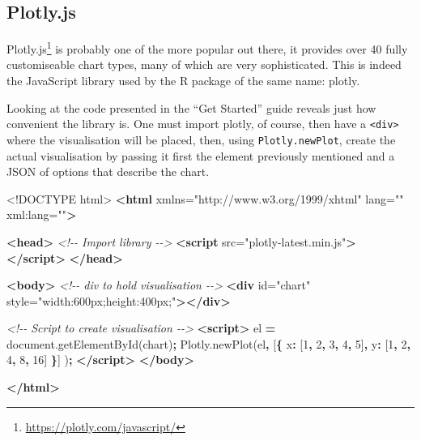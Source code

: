 \documentclass[
]{krantz}
\makeatletter
\newenvironment{Shaded}{\begin{snugshade}}{\end{snugshade}}
\newcommand{\AttributeTok}[1]{\textcolor[rgb]{0.61,0.61,0.61}{#1}}
\newcommand{\CommentTok}[1]{\textcolor[rgb]{0.37,0.37,0.37}{\textit{#1}}}
\newcommand{\DataTypeTok}[1]{\textcolor[rgb]{0.27,0.27,0.27}{#1}}
\newcommand{\DecValTok}[1]{\textcolor[rgb]{0.06,0.06,0.06}{#1}}
\newcommand{\KeywordTok}[1]{\textcolor[rgb]{0.27,0.27,0.27}{\textbf{#1}}}
\newcommand{\NormalTok}[1]{#1}
\newcommand{\OperatorTok}[1]{\textcolor[rgb]{0.43,0.43,0.43}{\textbf{#1}}}
\newcommand{\OtherTok}[1]{\textcolor[rgb]{0.37,0.37,0.37}{#1}}
\newcommand{\StringTok}[1]{\textcolor[rgb]{0.5,0.5,0.5}{#1}}
\newcommand{\VariableTok}[1]{\textcolor[rgb]{0,0,0}{#1}}
\renewcommand{\href}[2]{#2\footnote{\url{#1}}}
\newenvironment{kframe}{%
\medskip{}
\setlength{\fboxsep}{.8em}
 \def\at@end@of@kframe{}%
 \ifinner\ifhmode%
  \def\at@end@of@kframe{\end{minipage}}%
  \begin{minipage}{\columnwidth}%
 \fi\fi%
 \def\FrameCommand##1{\hskip\@totalleftmargin \hskip-\fboxsep
 \colorbox{shadecolor}{##1}\hskip-\fboxsep
     \hskip-\linewidth \hskip-\@totalleftmargin \hskip\columnwidth}%
 \MakeFramed {\advance\hsize-\width
   \@totalleftmargin\z@ \linewidth\hsize
   \@setminipage}}%
 {\par\unskip\endMakeFramed%
 \at@end@of@kframe}
\renewenvironment{Shaded}{\begin{kframe}}{\end{kframe}}
\makeatother
\begin{document}
\hypertarget{widgets-basics-candidates-plotly}{%
\subsection{Plotly.js}\label{widgets-basics-candidates-plotly}}

\href{https://plotly.com/javascript/}{Plotly.js} is probably one of the more popular out there, it provides over 40 fully customiseable chart types, many of which are very sophisticated. This is indeed the JavaScript library used by the R package of the same name: plotly.

Looking at the code presented in the ``Get Started'' guide reveals just how convenient the library is. One must import plotly, of course, then have a \texttt{\textless{}div\textgreater{}} where the visualisation will be placed, then, using \texttt{Plotly.newPlot}, create the actual visualisation by passing it first the element previously mentioned and a JSON of options that describe the chart.

\begin{Shaded}
\begin{Highlighting}[]
\DataTypeTok{<!DOCTYPE }\NormalTok{html}\DataTypeTok{>}
\KeywordTok{<html}\OtherTok{ xmlns=}\StringTok{"http://www.w3.org/1999/xhtml"}\OtherTok{ lang=}\StringTok{""}\OtherTok{ xml:lang=}\StringTok{""}\KeywordTok{>}

\KeywordTok{<head>}
  \CommentTok{<!{-}{-} Import library {-}{-}>}
  \KeywordTok{<script}\OtherTok{ src=}\StringTok{"plotly{-}latest.min.js"}\KeywordTok{></script>}
\KeywordTok{</head>}

\KeywordTok{<body>}
  \CommentTok{<!{-}{-} div to hold visualisation {-}{-}>}
  \KeywordTok{<div}\OtherTok{ id=}\StringTok{"chart"}\OtherTok{ style=}\StringTok{"width:600px;height:400px;"}\KeywordTok{></div>}

  \CommentTok{<!{-}{-} Script to create visualisation {-}{-}>}
  \KeywordTok{<script>}
\NormalTok{    el }\OperatorTok{=} \VariableTok{document}\NormalTok{.}\AttributeTok{getElementById}\NormalTok{(}\StringTok{\textquotesingle{}chart\textquotesingle{}}\NormalTok{)}\OperatorTok{;}
    \VariableTok{Plotly}\NormalTok{.}\AttributeTok{newPlot}\NormalTok{(el}\OperatorTok{,}\NormalTok{ [}\OperatorTok{\{}
      \DataTypeTok{x}\OperatorTok{:}\NormalTok{ [}\DecValTok{1}\OperatorTok{,} \DecValTok{2}\OperatorTok{,} \DecValTok{3}\OperatorTok{,} \DecValTok{4}\OperatorTok{,} \DecValTok{5}\NormalTok{]}\OperatorTok{,}
      \DataTypeTok{y}\OperatorTok{:}\NormalTok{ [}\DecValTok{1}\OperatorTok{,} \DecValTok{2}\OperatorTok{,} \DecValTok{4}\OperatorTok{,} \DecValTok{8}\OperatorTok{,} \DecValTok{16}\NormalTok{] }\OperatorTok{\}}\NormalTok{]}
\NormalTok{    )}\OperatorTok{;}
  \KeywordTok{</script>}
\KeywordTok{</body>}

\KeywordTok{</html>}
\end{Highlighting}
\end{Shaded}
\end{document}
